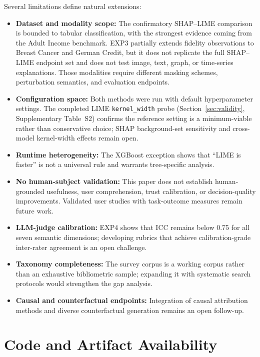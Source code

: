 \documentclass[twoside,11pt]{article}
\begin{document}
Several limitations define natural extensions:
\begin{itemize}[leftmargin=*]
\item \textbf{Dataset and modality scope:} The confirmatory SHAP--LIME
comparison is bounded to tabular classification, with the strongest
evidence coming from the Adult Income benchmark. EXP3 partially extends
fidelity observations to Breast Cancer and German Credit, but it does not
replicate the full SHAP--LIME endpoint set and does not test image, text,
graph, or time-series explanations. Those modalities require different
masking schemes, perturbation semantics, and evaluation endpoints.
\item \textbf{Configuration space:} Both methods were run with default
hyperparameter settings. The completed LIME \texttt{kernel\_width} probe
(Section~\ref{sec:validity}, Supplementary Table~S2) confirms the
reference setting is a minimum-viable rather than conservative choice;
SHAP background-set sensitivity and cross-model kernel-width effects
remain open.
\item \textbf{Runtime heterogeneity:} The XGBoost exception shows that
``LIME is faster'' is not a universal rule and warrants tree-specific analysis.
\item \textbf{No human-subject validation:} This paper does not establish
human-grounded usefulness, user comprehension, trust calibration, or
decision-quality improvements. Validated user studies with task-outcome
measures remain future work.
\item \textbf{LLM-judge calibration:} EXP4 shows that ICC remains below
0.75 for all seven semantic dimensions; developing rubrics that achieve
calibration-grade inter-rater agreement is an open challenge.
\item \textbf{Taxonomy completeness:} The survey corpus is a working
corpus rather than an exhaustive bibliometric sample; expanding it with
systematic search protocols would strengthen the gap analysis.
\item \textbf{Causal and counterfactual endpoints:} Integration of
causal attribution methods and diverse counterfactual generation
\citep{mothilal2020dice} remains an open follow-up.
\end{itemize}

\section{Code and Artifact Availability}
\label{sec:artifacts}
\end{document}
